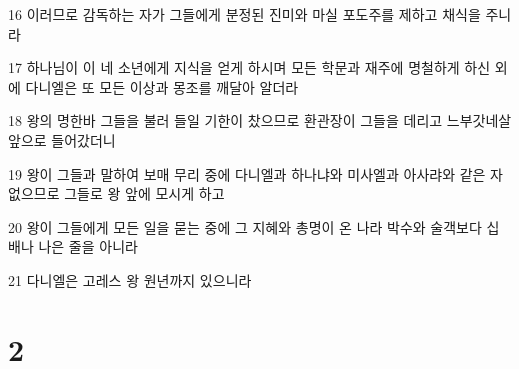 \par 16 이러므로 감독하는 자가 그들에게 분정된 진미와 마실 포도주를 제하고 채식을 주니라
\par 17 하나님이 이 네 소년에게 지식을 얻게 하시며 모든 학문과 재주에 명철하게 하신 외에 다니엘은 또 모든 이상과 몽조를 깨달아 알더라
\par 18 왕의 명한바 그들을 불러 들일 기한이 찼으므로 환관장이 그들을 데리고 느부갓네살 앞으로 들어갔더니
\par 19 왕이 그들과 말하여 보매 무리 중에 다니엘과 하나냐와 미사엘과 아사랴와 같은 자 없으므로 그들로 왕 앞에 모시게 하고
\par 20 왕이 그들에게 모든 일을 묻는 중에 그 지혜와 총명이 온 나라 박수와 술객보다 십배나 나은 줄을 아니라
\par 21 다니엘은 고레스 왕 원년까지 있으니라

\chapter{2}

